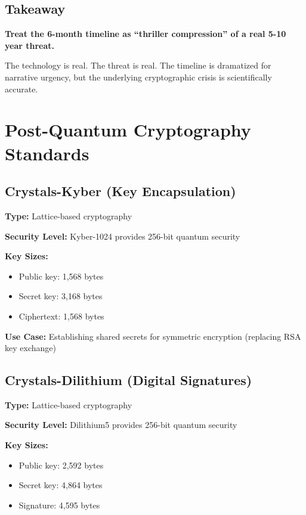 \documentclass[12pt,oneside]{book}
\begin{document}
\subsection{Takeaway}

\textcolor{neongreen}{\textbf{Treat the 6-month timeline as ``thriller compression'' of a real 5-10 year threat.}}

The technology is real. The threat is real. The timeline is dramatized for narrative urgency, but the underlying cryptographic crisis is scientifically accurate.

\section{Post-Quantum Cryptography Standards}

\subsection{Crystals-Kyber (Key Encapsulation)}

\textbf{Type:} Lattice-based cryptography

\textbf{Security Level:} Kyber-1024 provides 256-bit quantum security

\textbf{Key Sizes:}
\begin{itemize}
\item Public key: 1,568 bytes
\item Secret key: 3,168 bytes
\item Ciphertext: 1,568 bytes
\end{itemize}

\textbf{Use Case:} Establishing shared secrets for symmetric encryption (replacing RSA key exchange)

\subsection{Crystals-Dilithium (Digital Signatures)}

\textbf{Type:} Lattice-based cryptography

\textbf{Security Level:} Dilithium5 provides 256-bit quantum security

\textbf{Key Sizes:}
\begin{itemize}
\item Public key: 2,592 bytes
\item Secret key: 4,864 bytes
\item Signature: 4,595 bytes
\end{itemize}
\end{document}
